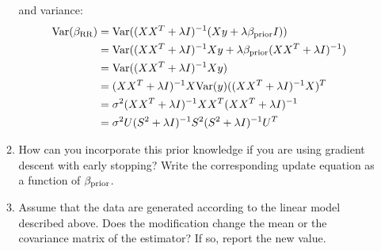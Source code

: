 \documentclass[12pt,twoside]{article}
\begin{document}
\begin{enumerate}
\begin{enumerate}
and variance:	
\begin{align*}
	\Var(\beta_{\op{RR}})	&=	\Var( (X X^T  +  \lambda I)^{-1} (X y + \lambda \beta_{\op{prior}} I )) \\
						&=	\Var( (X X^T  +  \lambda I)^{-1}  X y + \lambda  \beta_{\op{prior}} (X X^T  +  \lambda I)^{-1} ) \\
						&=	\Var( (X X^T  +  \lambda I)^{-1}  X y) \\
						&=	(X X^T  +  \lambda I)^{-1}  X \var(y)	((X X^T  +  \lambda I)^{-1}  X)^T \\
						&=	\sigma^2 (X X^T  +  \lambda I)^{-1}  X X^T (X X^T  +  \lambda I)^{-1} \\
						&=	\sigma^2 U (S^2 + \lambda I)^{-1} S^2 (S^2 + \lambda I)^{-1} U^T		
\end{align*}					
						

   
    \item How can you incorporate this prior knowledge if you are using gradient descent with early stopping? Write the corresponding update equation as a function of $\beta_{\operatorname{prior}}$.
    \item Assume that the data are generated according to the linear model described above. Does the modification change the mean or the covariance matrix of the estimator? If so, report the new value.
 \end{enumerate}
 

\end{enumerate}
\end{document}
